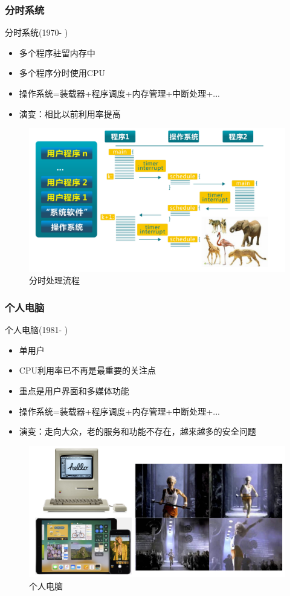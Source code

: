 \documentclass[UTF8]{ctexbeamer}
\begin{document}
\begin{frame}
	
	\frametitle{分时系统}
	
	分时系统(1970- )
	\begin{itemize}
		\item 多个程序驻留内存中
		\item 多个程序分时使用CPU	
		\item 操作系统=装载器+程序调度+内存管理+中断处理+...
		\item 演变：相比以前利用率提高
	\end{itemize}
	
	\begin{figure}
		\centering
		\includegraphics[width=0.6\linewidth]{history-timesharing}
		\caption{分时处理流程}
	\end{figure}
	
\end{frame}


\begin{frame}
	
	\frametitle{个人电脑}
	
	个人电脑(1981- )
	\begin{itemize}
		\item 单用户
		\item CPU利用率已不再是最重要的关注点	
		\item 重点是用户界面和多媒体功能
		\item 操作系统=装载器+程序调度+内存管理+中断处理+...
		\item 演变：走向大众，老的服务和功能不存在，越来越多的安全问题
	\end{itemize}
	
	\begin{figure}
		\centering
		\includegraphics[width=0.6\linewidth]{history-pc}
		\caption{个人电脑}
	\end{figure}
	
\end{frame}
\end{document}
